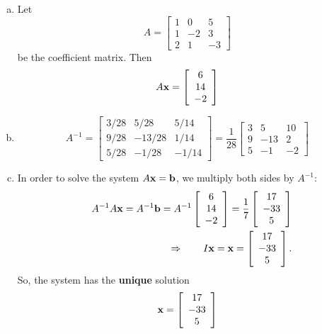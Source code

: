 \vspace{2mm}
\begin{enumerate}[a)]
  \item Let
$$
A = \left[\begin{array}{ccc}1&0&5\\1&-2&3\\2&1&-3\end{array}\right]
$$
be the coefficient matrix. Then
$$
A{\bf x} = \left[\begin{array}{c}6\\14\\-2\end{array}\right]
$$
	\item
$$
A^{-1} = \left[\begin{array}{ccc}3/28&5/28&5/14\\9/28&-13/28&1/14\\5/28&-1/28&-1/14\end{array}\right]
=\frac{1}{28}\left[\begin{array}{ccc}3&5&10\\9&-13&2\\5&-1&-2\end{array}\right]
$$
	\item
In order to solve the system $A{\bf x}={\bf b}$, we multiply both sides by $A^{-1}$:
\begin{eqnarray*}
  &&A^{-1}A{\bf x}=A^{-1}{\bf b}=A^{-1}\left[\begin{array}{c}6\\14\\-2\end{array}\right]=
	\frac{1}{7}\left[\begin{array}{c}17\\-33\\5\end{array}\right]\\
	&&\Rightarrow \qquad I{\bf x}={\bf x}=\left[\begin{array}{c}17\\-33\\5\end{array}\right].
\end{eqnarray*}
So, the system has the \textbf{unique} solution
$$
{\bf x}=\left[\begin{array}{c}17\\-33\\5\end{array}\right]
$$
\end{enumerate}

